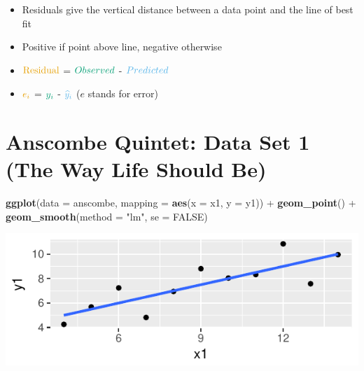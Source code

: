 \documentclass[]{article}
\newenvironment{Shaded}{\begin{snugshade}}{\end{snugshade}}
\newcommand{\KeywordTok}[1]{\textcolor[rgb]{0.13,0.29,0.53}{\textbf{{#1}}}}
\newcommand{\DataTypeTok}[1]{\textcolor[rgb]{0.13,0.29,0.53}{{#1}}}
\newcommand{\StringTok}[1]{\textcolor[rgb]{0.31,0.60,0.02}{{#1}}}
\newcommand{\OtherTok}[1]{\textcolor[rgb]{0.56,0.35,0.01}{{#1}}}
\newcommand{\NormalTok}[1]{{#1}}
\begin{document}
\begin{itemize}
\item
  Residuals give the vertical distance between a data point and the line
  of best fit
\item
  Positive if point above line, negative otherwise
\item
  \(\definecolor{residual}{RGB}{230,159,0}\color{residual}\text{Residual}\)
  = \(\definecolor{observed}{RGB}{0,158,115}\color{observed}Observed\) -
  \(\definecolor{predicted}{RGB}{86,180,233}\color{predicted}Predicted\)
\item
  \(\definecolor{residual}{RGB}{230,159,0}\color{residual}e_i\) =
  \(\definecolor{observed}{RGB}{0,158,115}\color{observed}y_i\) -
  \(\definecolor{predicted}{RGB}{86,180,233}\color{predicted}\widehat{y}_i\)
  (\(e\) stands for error)
\end{itemize}

\newpage

\section{Anscombe Quintet: Data Set 1 (The Way Life Should
Be)}\label{anscombe-quintet-data-set-1-the-way-life-should-be}

\begin{Shaded}
\begin{Highlighting}[]
\KeywordTok{ggplot}\NormalTok{(}\DataTypeTok{data =} \NormalTok{anscombe, }\DataTypeTok{mapping =} \KeywordTok{aes}\NormalTok{(}\DataTypeTok{x =} \NormalTok{x1, }\DataTypeTok{y =} \NormalTok{y1)) +}
\StringTok{  }\KeywordTok{geom_point}\NormalTok{() +}
\StringTok{  }\KeywordTok{geom_smooth}\NormalTok{(}\DataTypeTok{method =} \StringTok{"lm"}\NormalTok{, }\DataTypeTok{se =} \OtherTok{FALSE}\NormalTok{)}
\end{Highlighting}
\end{Shaded}

\includegraphics{20180417_anscombe_residuals_files/figure-latex/unnamed-chunk-3-1.pdf}
\end{document}
